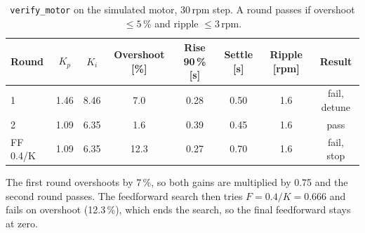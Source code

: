 \documentclass[11pt,a4paper]{report}
\newcommand{\code}[1]{\texttt{#1}}
\begin{document}
\begin{table}[H]
\centering
\caption{\code{verify\_motor} on the simulated motor, 30\,rpm step. A round passes if overshoot $\le5$\,\% and ripple $\le3$\,rpm.}
\small
\begin{tabular}{@{}lccccccc@{}}
\toprule
Round & $K_p$ & $K_i$ & Overshoot [\%] & Rise 90\,\% [s] & Settle [s] & Ripple [rpm] & Result\\
\midrule
1 & 1.46 & 8.46 & 7.0 & 0.28 & 0.50 & 1.6 & fail, detune\\
2 & 1.09 & 6.35 & 1.6 & 0.39 & 0.45 & 1.6 & pass\\
FF 0.4/K & 1.09 & 6.35 & 12.3 & 0.27 & 0.70 & 1.6 & fail, stop\\
\bottomrule
\end{tabular}
\end{table}

The first round overshoots by 7\,\%, so both gains are multiplied by 0.75 and the second round passes. The feedforward search then tries $F=0.4/K=0.666$ and fails on overshoot (12.3\,\%), which ends the search, so the final feedforward stays at zero.
\end{document}
